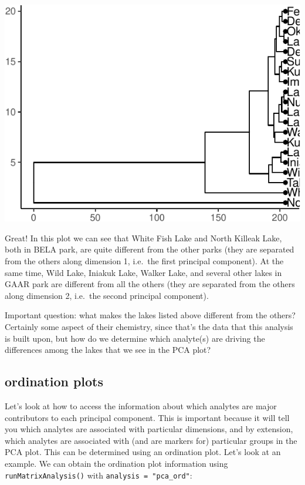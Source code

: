 \documentclass[
]{krantz}
\begin{document}
\begin{center}\includegraphics{index_files/figure-latex/unnamed-chunk-94-1} \end{center}

Great! In this plot we can see that White Fish Lake and North Killeak Lake, both in BELA park, are quite different from the other parks (they are separated from the others along dimension 1, i.e.~the first principal component). At the same time, Wild Lake, Iniakuk Lake, Walker Lake, and several other lakes in GAAR park are different from all the others (they are separated from the others along dimension 2, i.e.~the second principal component).

Important question: what makes the lakes listed above different from the others? Certainly some aspect of their chemistry, since that's the data that this analysis is built upon, but how do we determine which analyte(s) are driving the differences among the lakes that we see in the PCA plot?

\hypertarget{ordination-plots}{%
\subsection{ordination plots}\label{ordination-plots}}

Let's look at how to access the information about which analytes are major contributors to each principal component. This is important because it will tell you which analytes are associated with particular dimensions, and by extension, which analytes are associated with (and are markers for) particular groups in the PCA plot. This can be determined using an ordination plot. Let's look at an example. We can obtain the ordination plot information using \texttt{runMatrixAnalysis()} with \texttt{analysis\ =\ "pca\_ord"}:
\end{document}
